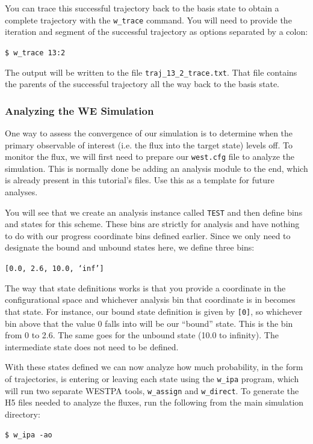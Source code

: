 \documentclass[9pt,tutorial]{livecoms}
\begin{document}
You can trace this successful trajectory back to the basis state to obtain a complete trajectory with the \verb|w_trace| command. 
You will need to provide the iteration and segment of the successful trajectory as options separated by a colon:
 
\verb|$ w_trace 13:2|
 
The output will be written to the file \verb|traj_13_2_trace.txt|. 
That file contains the parents of the successful trajectory all the way back to the basis state.

\subsubsection{Analyzing the WE Simulation}

One way to assess the convergence of our simulation is to determine when the primary observable of interest (i.e. the flux into the target state) levels off. 
To monitor the flux, we will first need to prepare our \verb|west.cfg| file to analyze the simulation. 
This is normally done be adding an analysis module to the end, which is already present in this tutorial’s files. 
Use this as a template for future analyses.

You will see that we create an analysis instance called \verb|TEST| and then define bins and states for this scheme. 
These bins are strictly for analysis and have nothing to do with our progress coordinate bins defined earlier. 
Since we only need to designate the bound and unbound states here, we define three bins:
 
\verb|[0.0, 2.6, 10.0, ‘inf’]|
 
The way that state definitions works is that you provide a coordinate in the configurational space and whichever analysis bin that coordinate is in becomes that state. 
For instance, our bound state definition is given by \verb|[0]|, so whichever bin above that the value 0 falls into will be our “bound” state. 
This is the bin from 0 to 2.6. 
The same goes for the unbound state (10.0 to infinity). 
The intermediate state does not need to be defined.

With these states defined we can now analyze how much probability, in the form of trajectories, is entering or leaving each state using the \verb|w_ipa| program, which will run two separate WESTPA tools, \verb|w_assign| and \verb|w_direct|. 
To generate the H5 files needed to analyze the fluxes, run the following from the main simulation directory:
 
\verb|$ w_ipa -ao|
\end{document}
